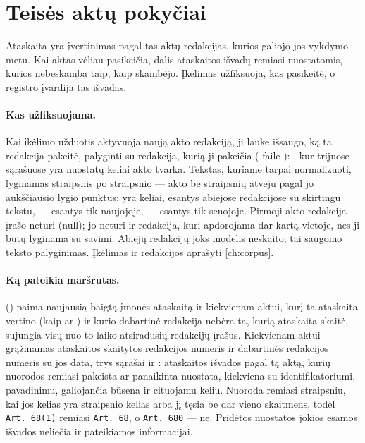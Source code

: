 \section{Teisės aktų pokyčiai}\label{sec:register:law}

Ataskaita yra įvertinimas pagal tas aktų redakcijas, kurios galiojo jos vykdymo metu. Kai aktas
vėliau pasikeičia, dalis ataskaitos išvadų remiasi nuostatomis, kurios nebeskamba taip, kaip
skambėjo. Įkėlimas užfiksuoja, kas pasikeitė, o registro  įvardija tas
išvadas.

\paragraph{Kas užfiksuojama.} Kai įkėlimo užduotis aktyvuoja naują akto redakciją, ji lauke
 išsaugo, ką ta redakcija pakeitė, palyginti su redakcija,
kurią ji pakeičia ( faile ): , kur trijuose sąrašuose yra nuostatų keliai akto tvarka. Tekstas, kuriame tarpai normalizuoti,
lyginamas straipsnis po straipsnio --- akto be straipsnių atveju pagal jo aukščiausio lygio
punktus:  yra keliai, esantys abiejose redakcijose su skirtingu tekstu,
 --- esantys tik naujojoje,  --- esantys tik senojoje. Pirmoji akto
redakcija įrašo neturi (null); jo neturi ir redakcija, kuri apdorojama dar kartą vietoje, nes ji
būtų lyginama su savimi. Abiejų redakcijų joks modelis neskaito; tai saugomo teksto palyginimas.
Įkėlimas ir redakcijos aprašyti \cref{ch:corpus}.

\paragraph{Ką pateikia maršrutas.} 
() paima naujausią baigtą įmonės ataskaitą ir kiekvienam aktui, kurį ta
ataskaita vertino (kaip  ar ) ir kurio dabartinė redakcija nebėra ta,
kurią ataskaita skaitė, sujungia visų nuo to laiko atsiradusių redakcijų įrašus. Kiekvienam aktui
grąžinamas ataskaitos skaitytos redakcijos numeris ir dabartinės redakcijos numeris su jos data,
trys sąrašai ir : ataskaitos išvados pagal tą aktą, kurių nuorodos remiasi pakeista
ar panaikinta nuostata, kiekviena su identifikatoriumi, pavadinimu, galiojančia būsena ir cituojamu
keliu. Nuoroda remiasi straipsniu, kai jos kelias yra straipsnio kelias arba jį tęsia be dar vieno
skaitmens, todėl \texttt{Art.\ 68(1)} remiasi \texttt{Art.\ 68}, o \texttt{Art.\ 680} --- ne.
Pridėtos nuostatos jokios esamos išvados neliečia ir pateikiamos informacijai.

